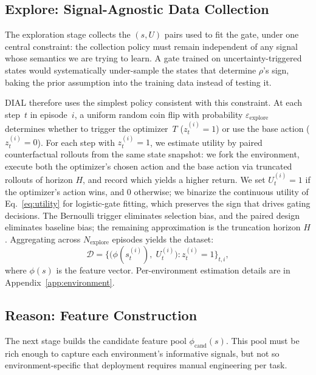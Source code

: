 \subsection{Explore: Signal-Agnostic Data Collection}
\label{sec:explore}
\vspace{-0.05in}
The exploration stage collects the $(s, U)$ pairs used to fit the gate, under one central constraint: the collection policy must remain independent of any signal whose semantics we are trying to learn. A gate trained on uncertainty-triggered states would systematically under-sample the states that determine $\rho$'s sign, baking the prior assumption into the training data instead of testing it.

DIAL therefore uses the simplest policy consistent with this constraint. At each step~$t$ in episode~$i$, a uniform random coin flip with probability $\varepsilon_{\text{explore}}$ determines whether to trigger the optimizer~$T$ ($z_t^{(i)}{=}1$) or use the base action ($z_t^{(i)}{=}0$). For each step with $z_t^{(i)}{=}1$, we estimate utility by paired counterfactual rollouts from the same state snapshot: we fork the environment, execute both the optimizer's chosen action and the base action via truncated rollouts of horizon $H$, and record which yields a higher return. We set $U_t^{(i)} = 1$ if the optimizer's action wins, and $0$ otherwise; we binarize the continuous utility of Eq.~\eqref{eq:utility} for logistic-gate fitting, which preserves the sign that drives gating decisions. The Bernoulli trigger eliminates selection bias, and the paired design eliminates baseline bias; the remaining approximation is the truncation horizon $H$. Aggregating across $N_{\text{explore}}$ episodes yields the dataset:
\begin{equation}
  \mathcal{D} = \bigl\{
    \bigl(\phi(s_t^{(i)}),\; U_t^{(i)}\bigr)
    : z_t^{(i)} = 1
  \bigr\}_{t, i},
  \label{eq:dataset}
\end{equation}
where $\phi(s)$ is the feature vector. Per-environment estimation details are in Appendix~\ref{app:environment}.

\vspace{-0.15in}
\subsection{Reason: Feature Construction}
\label{sec:reason}
\vspace{-0.05in}
The next stage builds the candidate feature pool $\phi_{\text{cand}}(s)$. This pool must be rich enough to capture each environment's informative signals, but not so environment-specific that deployment requires manual engineering per task.

